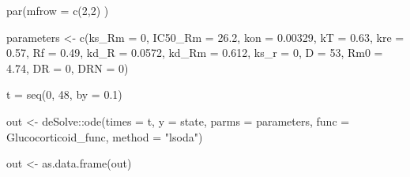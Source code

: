 \documentclass[
]{article}
\newenvironment{Shaded}{\begin{snugshade}}{\end{snugshade}}
\newcommand{\AttributeTok}[1]{\textcolor[rgb]{0.77,0.63,0.00}{#1}}
\newcommand{\DecValTok}[1]{\textcolor[rgb]{0.00,0.00,0.81}{#1}}
\newcommand{\FloatTok}[1]{\textcolor[rgb]{0.00,0.00,0.81}{#1}}
\newcommand{\FunctionTok}[1]{\textcolor[rgb]{0.00,0.00,0.00}{#1}}
\newcommand{\NormalTok}[1]{#1}
\newcommand{\OtherTok}[1]{\textcolor[rgb]{0.56,0.35,0.01}{#1}}
\newcommand{\SpecialCharTok}[1]{\textcolor[rgb]{0.00,0.00,0.00}{#1}}
\newcommand{\StringTok}[1]{\textcolor[rgb]{0.31,0.60,0.02}{#1}}
\begin{document}
\begin{Shaded}
\begin{Highlighting}[]
\FunctionTok{par}\NormalTok{(}\AttributeTok{mfrow =} \FunctionTok{c}\NormalTok{(}\DecValTok{2}\NormalTok{,}\DecValTok{2}\NormalTok{) )}

\NormalTok{parameters }\OtherTok{\textless{}{-}} \FunctionTok{c}\NormalTok{(}\AttributeTok{ks\_Rm =} \DecValTok{0}\NormalTok{, }\AttributeTok{IC50\_Rm =} \FloatTok{26.2}\NormalTok{, }\AttributeTok{kon =} \FloatTok{0.00329}\NormalTok{,}
                \AttributeTok{kT =} \FloatTok{0.63}\NormalTok{, }\AttributeTok{kre =} \FloatTok{0.57}\NormalTok{, }\AttributeTok{Rf =} \FloatTok{0.49}\NormalTok{, }\AttributeTok{kd\_R =} \FloatTok{0.0572}\NormalTok{,}
                \AttributeTok{kd\_Rm =} \FloatTok{0.612}\NormalTok{, }\AttributeTok{ks\_r =} \DecValTok{0}\NormalTok{, }\AttributeTok{D =} \DecValTok{53}\NormalTok{, }\AttributeTok{Rm0 =} \FloatTok{4.74}\NormalTok{,}
                \AttributeTok{DR =} \DecValTok{0}\NormalTok{, }\AttributeTok{DRN =} \DecValTok{0}\NormalTok{)}

\NormalTok{t }\OtherTok{=} \FunctionTok{seq}\NormalTok{(}\DecValTok{0}\NormalTok{, }\DecValTok{48}\NormalTok{, }\AttributeTok{by =} \FloatTok{0.1}\NormalTok{)}

\NormalTok{out }\OtherTok{\textless{}{-}}\NormalTok{ deSolve}\SpecialCharTok{::}\FunctionTok{ode}\NormalTok{(}\AttributeTok{times =}\NormalTok{ t, }\AttributeTok{y =}\NormalTok{ state, }\AttributeTok{parms =}\NormalTok{ parameters,}
                    \AttributeTok{func =}\NormalTok{ Glucocorticoid\_func, }\AttributeTok{method =} \StringTok{"lsoda"}\NormalTok{)}


\NormalTok{out }\OtherTok{\textless{}{-}} \FunctionTok{as.data.frame}\NormalTok{(out)}


\end{Highlighting}
\end{Shaded}
\end{document}
